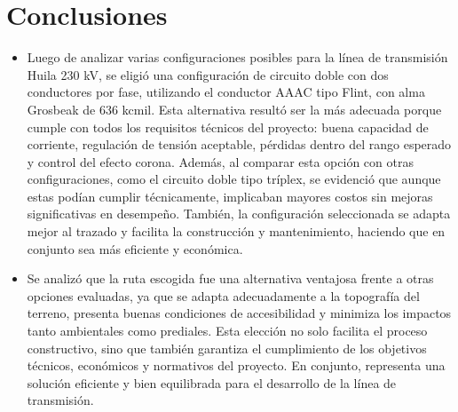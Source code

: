 \section{Conclusiones}
\begin{itemize}
    \item Luego de analizar varias configuraciones posibles para la línea de transmisión Huila 230 kV, se eligió una configuración de circuito doble con dos conductores por fase, utilizando el conductor AAAC tipo Flint, con alma Grosbeak de 636 kcmil. Esta alternativa resultó ser la más adecuada porque cumple con todos los requisitos técnicos del proyecto: buena capacidad de corriente, regulación de tensión aceptable, pérdidas dentro del rango esperado y control del efecto corona. Además, al comparar esta opción con otras configuraciones, como el circuito doble tipo tríplex, se evidenció que aunque estas podían cumplir técnicamente, implicaban mayores costos sin mejoras significativas en desempeño. También, la configuración seleccionada se adapta mejor al trazado y facilita la construcción y mantenimiento, haciendo que en conjunto sea más eficiente y económica.

    \item Se analizó que la ruta escogida fue una alternativa ventajosa frente a otras opciones evaluadas, ya que se adapta adecuadamente a la topografía del terreno, presenta buenas condiciones de accesibilidad y minimiza los impactos tanto ambientales como prediales. Esta elección no solo facilita el proceso constructivo, sino que también garantiza el cumplimiento de los objetivos técnicos, económicos y normativos del proyecto. En conjunto, representa una solución eficiente y bien equilibrada para el desarrollo de la línea de transmisión.
\end{itemize}